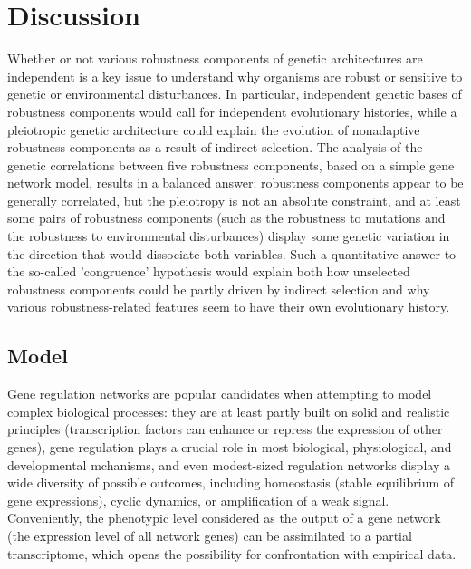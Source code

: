 \documentclass[10pt,a4paper]{article}
\begin{document}
\section{Discussion}

Whether or not various robustness components of genetic architectures are independent is a key issue to understand why organisms are robust or sensitive to genetic or environmental disturbances. In particular, independent genetic bases of robustness components would call for independent evolutionary histories, while a pleiotropic genetic architecture could explain the evolution of nonadaptive robustness components as a result of indirect selection. The analysis of the genetic correlations between five robustness components, based on a simple gene network model, results in a balanced answer: robustness components appear to be generally correlated, but the pleiotropy is not an absolute constraint, and at least some pairs of robustness components (such as the robustness to mutations and the robustness to environmental disturbances) display some genetic variation in the direction that would dissociate both variables. Such a quantitative answer to the so-called 'congruence' hypothesis \citep{dHW+03} would explain both how unselected robustness components could be partly driven by indirect selection and why various robustness-related features seem to have their own evolutionary history. 

\subsection{Model}

Gene regulation networks are popular candidates when attempting to model complex biological processes: they are at least partly built on solid and realistic principles (transcription factors can enhance or repress the expression of other genes), gene regulation plays a crucial role in most biological, physiological, and developmental mchanisms, and even modest-sized regulation networks display a wide diversity of possible outcomes, including homeostasis (stable equilibrium of gene expressions), cyclic dynamics, or amplification of a weak signal. Conveniently, the phenotypic level considered as the output of a gene network (the expression level of all network genes) can be assimilated to a partial transcriptome, which opens the possibility for confrontation with empirical data. 
\end{document}
